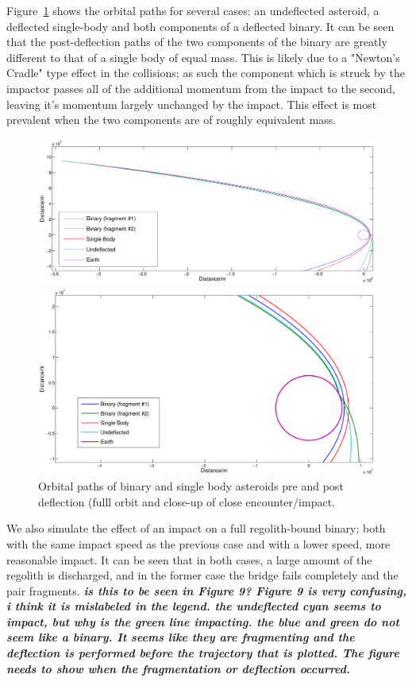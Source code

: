 \documentclass[letterpaper, preprint, paper,11pt]{AAS}	%
\begin{document}
Figure~\ref{fig:bouncey} shows the orbital paths for several cases: an undeflected asteroid, a deflected single-body and both components of a deflected binary. It can be seen that the post-deflection paths of the two components of the binary are greatly different to that of a single body of equal mass. This is likely due to a "Newton's Cradle" type effect in the collisions; as such the component which is struck by the impactor passes all of the additional momentum from the impact to the second, leaving it's momentum largely unchanged by the impact. This effect is most prevalent when the two components are of roughly equivalent mass.
\begin{figure}[H]
\centering
\centerline{\includegraphics[width=1.2\textwidth]{deflection_1.eps}}
\centerline{\includegraphics[width=1.2\textwidth]{deflection_0.eps}} 
\caption{Orbital paths of binary and single body asteroids pre and post deflection (fulll orbit and close-up of close encounter/impact.} 
\label{fig:bouncey}
\end{figure} 

We also simulate the effect of an impact on a full regolith-bound binary; both with the same impact speed as the previous case and with a lower speed, more reasonable impact. It can be seen that in both cases, a large amount of the regolith is discharged, and in the former case the bridge fails completely and the pair fragments. \textbf{\emph{is this to be seen in Figure 9? Figure 9 is very confusing, i think it is mislabeled in the legend. the undeflected cyan seems to impact, but why is the green line impacting. the blue and green do not seem like a binary. It seems like they are fragmenting and the deflection is performed before the trajectory that is plotted. The figure needs to show when the fragmentation or deflection occurred.}}
\end{document}

